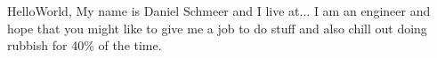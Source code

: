 

\begin{cvparagraph}
  HelloWorld, My name is Daniel Schmeer and I live at... I am an engineer and hope that you might like to give me a job to do stuff and also chill out doing rubbish for 40\% of the time.
\end{cvparagraph}
